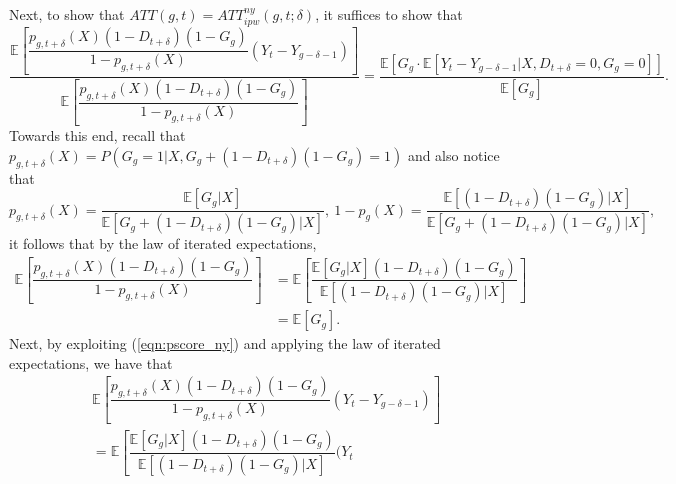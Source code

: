 \documentclass[11pt]{article}%
\theoremstyle{plain}
\numberwithin{sassumption}{section}
\numberwithin{equation}{section}
\begin{document}
{\small Next, to show that $ATT(g,t)=ATT_{ipw}^{ny}\left(  g,t;\delta\right)
$, it suffices to show that
\begin{equation}
\frac{\mathbb{E}\left[  \dfrac{p_{g,t+\delta}\left(  X\right)  \left(
1-D_{t+\delta}\right)  \left(  1-G_{g}\right)  }{1-p_{g,t+\delta}\left(
X\right)  }(Y_{t}-Y_{g-\delta-1})\right]  }{\mathbb{E}\left[  \dfrac
{p_{g,t+\delta}\left(  X\right)  \left(  1-D_{t+\delta}\right)  \left(
1-G_{g}\right)  }{1-p_{g,t+\delta}\left(  X\right)  }\right]  }=\frac
{\mathbb{E}\left[  G_{g}\cdot\mathbb{E}[Y_{t}-Y_{g-\delta-1}|X,D_{t+\delta
}=0,G_{g}=0]\right]  }{\mathbb{E}\left[  G_{g}\right]  }. \label{eqn:ipw_ny}%
\end{equation}
Towards this end, recall that $p_{g,t+\delta}(X)=P(G_{g}=1|X,G_{g}+\left(
1-D_{t+\delta}\right)  \left(  1-G_{g}\right)  =1)$ and also notice that 
\begin{equation}
p_{g,t+\delta}\left(  X\right)  =\frac{\mathbb{E}\left[  G_{g}|X\right]
}{\mathbb{E}\left[  G_{g}+\left(  1-D_{t+\delta}\right)  \left(
1-G_{g}\right)  |X\right]  },~1-p_{g}\left(  X\right)  =\frac{\mathbb{E}%
\left[  \left(  1-D_{t+\delta}\right)  \left(  1-G_{g}\right)  |X\right]
}{\mathbb{E}\left[  G_{g}+\left(  1-D_{t+\delta}\right)  \left(
1-G_{g}\right)  |X\right]  }, \label{eqn:pscore_ny}%
\end{equation}
it follows that by the law of iterated expectations,%
\begin{align}
\mathbb{E}\left[  \dfrac{p_{g,t+\delta}\left(  X\right)  \left(
1-D_{t+\delta}\right)  \left(  1-G_{g}\right)  }{1-p_{g,t+\delta}\left(
X\right)  }\right]   &  =\mathbb{E}\left[  \dfrac{\mathbb{E}\left[
G_{g}|X\right]  \left(  1-D_{t+\delta}\right)  \left(  1-G_{g}\right)
}{\mathbb{E}\left[  \left(  1-D_{t+\delta}\right)  \left(  1-G_{g}\right)
|X\right]  }\right] \nonumber\\
&  =\mathbb{E}\left[  G_{g}\right]  . \label{eqn:hajek_ny}%
\end{align}
Next, by exploiting (\ref{eqn:pscore_ny}) and applying the law of iterated
expectations, we have that%
\begin{align*}
&  \mathbb{E}\left[  \dfrac{p_{g,t+\delta}\left(  X\right)  \left(
1-D_{t+\delta}\right)  \left(  1-G_{g}\right)  }{1-p_{g,t+\delta}\left(
X\right)  }(Y_{t}-Y_{g-\delta-1})\right] \\
&  =\mathbb{E}\left[  \dfrac{\mathbb{E}\left[  G_{g}|X\right]  \left(
1-D_{t+\delta}\right)  \left(  1-G_{g}\right)  }{\mathbb{E}\left[  \left(
1-D_{t+\delta}\right)  \left(  1-G_{g}\right)  |X\right]  }(Y_{t}%

\end{align*}}
\end{document}

